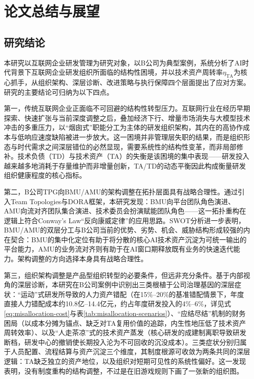 
\chapter{论文总结与展望}

\section{研究结论}

本研究以互联网企业研发管理为研究对象，以B公司为典型案例，系统分析了AI时代背景下互联网企业研发组织所面临的结构性困境，并以技术资产周转率$\eta_{\mathrm{TA}}$为核心抓手，从组织架构、深层诊断、改进策略与执行保障四个层面提出了应对方案。研究的主要结论可归纳为以下四点。

第一，传统互联网企业正面临不可回避的结构性转型压力。互联网行业在经历早期探索、快速扩张与当前深度调整之后，叠加经济下行、增量市场消失与大模型技术冲击的多重压力，以“烟囱式”职能分工为主体的研发组织架构，其内在的高协作成本与低响应速度缺陷被进一步放大。这一困境并非管理层失职的结果，而是组织形态与时代需求之间深层错位的必然显现，需要系统性的结构性变革，而非局部修补。技术负债（TD）与技术资产（TA）的失衡是该困境的集中表现——研发投入越来越多地消耗于存量维护而非增量创新，TA/TD的动态平衡因此构成衡量研发组织健康程度的核心指标\cite{kruchten2012technical,seaman2014measuring,cunningham1993wycash,tom2013exploration}。

第二，B公司TPG向BMU/AMU的架构调整在拓扑层面具有战略合理性。通过引入Team Topologies与DORA框架，本研究发现：BMU向平台团队角色演进、AMU向流对齐团队集合演进、技术委员会扮演赋能团队角色——这一拓扑重构在逻辑上符合Conway's Law“反向康威定律”的应用思路。SWOT分析进一步表明，BMU/AMU的双层分工与B公司当前的优势、劣势、机会、威胁结构形成较强的内在契合：BMU的集中化定位有助于将分散的核心AI技术资产沉淀为可统一输出的平台能力，AMU的业务流对齐则有助于在AI窗口期释放既有业务的快速迭代能力。架构调整的方向选择本身具有战略合理性。

第三，组织架构调整是产品型组织转型的必要条件，但远非充分条件。基于内部视角的深层诊断，本研究在B公司案例中识别出三类根植于公司治理基因的深层症状：“运动”式研发所导致的人力资产错配（在15\%--20\%的基准错配情景下，年度直接人力错配成本约10.8亿--14.4亿元，约占年度研发投入的4\%--6\%，详见式\eqref{eq:misallocation-cost}与表\ref{tab:misallocation-scenarios}）、“应结尽结”机制的财务困局（以成本分摊为锚点、缺乏对TA复用价值的追踪，内生性地压低了技术资产周转效率）、以及“人走茶凉”式的技术资产蒸发（核心研发的成建制离职导致研发断档，研发中心的撤销使长期投入沦为不可回收的沉没成本）。三类症状分别归属于人员配置、流程结算与资产沉淀三个维度，其制度根源可收敛为两条共同的深层逻辑：TA缺乏独立的资产地位，以及组织对短期可见性的系统性偏好。这一发现表明，没有制度重构的结构调整，不过是在旧游戏规则下画了一张新的组织图。

